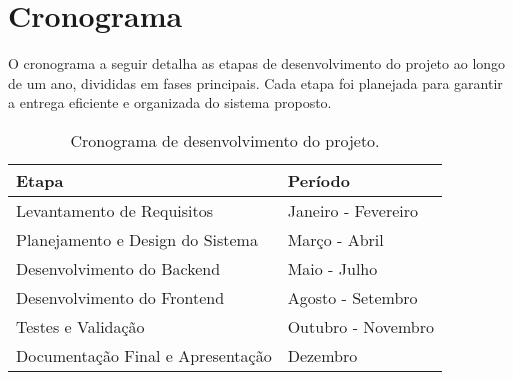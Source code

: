 \documentclass[../main.tex]{subfiles}
\begin{document}
\section{Cronograma}
O cronograma a seguir detalha as etapas de desenvolvimento do projeto ao longo de um ano, divididas em fases principais. Cada etapa foi planejada para garantir a entrega eficiente e organizada do sistema proposto.

\begin{table}[h!] 
    \centering
    \begin{tabular}{|p{6cm}|p{6cm}|}
        \hline
        \textbf{Etapa} & \textbf{Período} \\ \hline
        Levantamento de Requisitos & Janeiro - Fevereiro \\ \hline
        Planejamento e Design do Sistema & Março - Abril \\ \hline
        Desenvolvimento do Backend & Maio - Julho \\ \hline
        Desenvolvimento do Frontend & Agosto - Setembro \\ \hline
        Testes e Validação & Outubro - Novembro \\ \hline
        Documentação Final e Apresentação & Dezembro \\ \hline
    \end{tabular}
    \caption{Cronograma de desenvolvimento do projeto.}
    \label{tab:cronograma}
\end{table}
\end{document}
